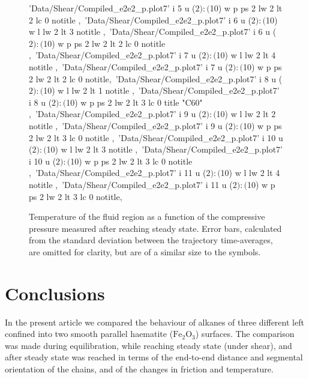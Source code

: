 \documentclass[aps,prb,reprint,superscriptaddress, a4paper]{revtex4-1}
\begin{document}
\begin{figure}
\begin{center}
\begin{gnuplot}[terminal=pdf, terminaloptions={size \SERFigwidth cm, \SERFigheight cm color solid}]
							'Data/Shear/Compiled_e2e2_p.plot7' i 5 u ($2):($10) w p ps 2   lw 2  lt 2  lc 0  notitle ,\
						'Data/Shear/Compiled_e2e2_p.plot7' i 6 u ($2):($10) w l  lw 2  lt 3 notitle   ,\
						'Data/Shear/Compiled_e2e2_p.plot7' i 6 u ($2):($10) w p ps 2   lw 2  lt 2  lc 0  notitle   ,\
							'Data/Shear/Compiled_e2e2_p.plot7' i 7 u ($2):($10) w l  lw 2  lt 4 notitle ,\
							'Data/Shear/Compiled_e2e2_p.plot7' i 7 u ($2):($10) w p ps 2   lw 2  lt 2  lc 0  notitle,\
						'Data/Shear/Compiled_e2e2_p.plot7' i 8 u ($2):($10) w l  lw 2  lt 1 notitle ,\
						'Data/Shear/Compiled_e2e2_p.plot7' i 8 u ($2):($10) w p ps 2   lw 2  lt 3 lc 0  title "C60" ,\
							'Data/Shear/Compiled_e2e2_p.plot7' i 9 u ($2):($10) w l  lw 2  lt 2 notitle ,\
							'Data/Shear/Compiled_e2e2_p.plot7' i 9 u ($2):($10) w p ps 2   lw 2  lt 3  lc 0  notitle ,\
						'Data/Shear/Compiled_e2e2_p.plot7' i 10 u ($2):($10) w l  lw 2  lt 3 notitle   ,\
						'Data/Shear/Compiled_e2e2_p.plot7' i 10 u ($2):($10) w p ps 2   lw 2  lt 3  lc 0  notitle   ,\
							'Data/Shear/Compiled_e2e2_p.plot7' i 11 u ($2):($10) w l  lw 2  lt 4 notitle ,\
							'Data/Shear/Compiled_e2e2_p.plot7' i 11 u ($2):($10) w p ps 2   lw 2  lt 3  lc 0  notitle,\
		\end{gnuplot}

		\caption{Temperature of the fluid region  as a function of the compressive pressure measured after reaching steady state. Error bars, calculated from the standard deviation between the trajectory time-averages, are omitted for clarity, but are of a similar size to the symbols.}
		\label{fig:T_P}
	\end{center}
 \end{figure}






\section{Conclusions}
\label{sec:Conc}


In the present article we compared the behaviour of alkanes of three different left confined into two smooth parallel haematite ($\text{Fe}_2\text{O}_3$) surfaces. The comparison was made during equilibration, while reaching steady state (under shear), and after steady state was reached in terms of the end-to-end distance and segmental orientation of the chains, and of the changes in friction and temperature.
\end{document}

